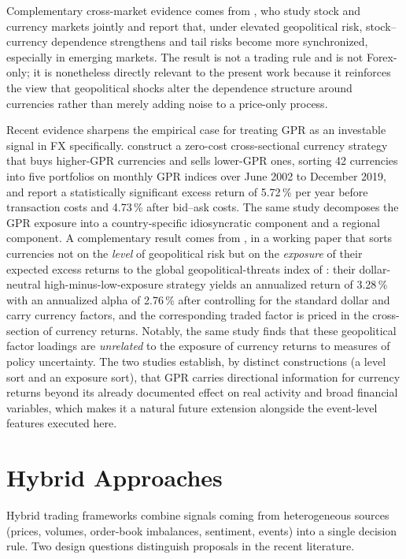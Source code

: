 Complementary cross-market evidence comes from , who study stock and currency markets jointly and report that, under elevated geopolitical risk, stock--currency dependence strengthens and tail risks become more synchronized, especially in emerging markets. The result is not a trading rule and is not Forex-only; it is nonetheless directly relevant to the present work because it reinforces the view that geopolitical shocks alter the dependence structure around currencies rather than merely adding noise to a price-only process.

Recent evidence sharpens the empirical case for treating GPR as an investable signal in FX specifically.  construct a zero-cost cross-sectional currency strategy that buys higher-GPR currencies and sells lower-GPR ones, sorting 42 currencies into five portfolios on monthly GPR indices over June 2002 to December 2019, and report a statistically significant excess return of 5.72\,\% per year before transaction costs and 4.73\,\% after bid--ask costs. The same study decomposes the GPR exposure into a country-specific idiosyncratic component and a regional component. A complementary result comes from , in a working paper that sorts currencies not on the \emph{level} of geopolitical risk but on the \emph{exposure} of their expected excess returns to the global geopolitical-threats index of : their dollar-neutral high-minus-low-exposure strategy yields an annualized return of 3.28\,\% with an annualized alpha of 2.76\,\% after controlling for the standard dollar and carry currency factors, and the corresponding traded factor is priced in the cross-section of currency returns. Notably, the same study finds that these geopolitical factor loadings are \emph{unrelated} to the exposure of currency returns to measures of policy uncertainty. The two studies establish, by distinct constructions (a level sort and an exposure sort), that GPR carries directional information for currency returns beyond its already documented effect on real activity and broad financial variables, which makes it a natural future extension alongside the event-level features executed here.

\section{Hybrid Approaches} \label{sec:hybrid}

Hybrid trading frameworks combine signals coming from heterogeneous sources (prices, volumes, order-book imbalances, sentiment, events) into a single decision rule. Two design questions distinguish proposals in the recent literature.

